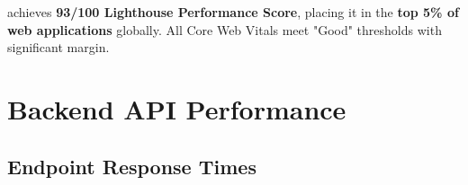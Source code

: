 \begin{successbox}
\projectname{} achieves \textbf{93/100 Lighthouse Performance Score}, placing it in the \textbf{top 5\% of web applications} globally. All Core Web Vitals meet "Good" thresholds with significant margin.
\end{successbox}

\section{Backend API Performance}
\label{sec:backend-performance}

\subsection{Endpoint Response Times}

